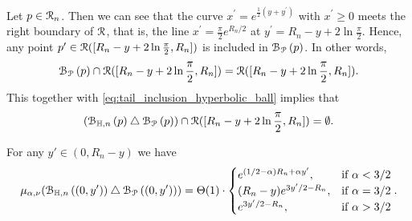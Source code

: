 Let $p \in {\mathcal R}_n$. Then we can see that the curve $x^\prime = e^{\frac{1}{2} (y + y^\prime)}$ with $x^\prime \geq 0$ meets the right boundary of ${\mathcal R}$, that is, the line $x^\prime = \frac{\pi}{2} e^{R_n/2}$ at $y^\prime = R_n - y + 2\ln \frac{\pi}{2}$. Hence, any point $p^{\prime} \in {\mathcal R} ([R_n - y + 2\ln \frac{\pi}{2}, R_n])$ is included in ${\mathcal B}_{{\mathcal P}}\left(p\right)$. In other words,
\begin{equation*} \label{eq:P_ball_inclusion_lower}
{\mathcal B}_{{\mathcal P}}\left(p\right) \cap {\mathcal R} ([R_n - y +2\ln \frac{\pi}{2},R_n]) = {\mathcal R} ([R_n - y + 2\ln \frac{\pi}{2},R_n]).
\end{equation*}
This together with \eqref{eq:tail_inclusion_hyperbolic_ball} implies that 
\begin{equation}\label{eq:symm_diff_upper_P} 
({\mathcal B}_{\mathbb{H},n}\left(p\right) \bigtriangleup {\mathcal B}_{{\mathcal P}}\left(p\right))  \cap {\mathcal R} ([R_n - y + 2 \ln \frac{\pi}{2},R_n]) = \emptyset. 
\end{equation}

\begin{lemma}\label{lem:sym_diff_measure_H_P}
For any $y' \in (0,R_n - y)$ we have
\[
	\mu_{\alpha,\nu} ({\mathcal B}_{\mathbb{H},n}\left((0,y')\right) \bigtriangleup {\mathcal B}_{{\mathcal P}}\left((0,y')\right) ) 
	= \Theta (1) \cdot \begin{cases} 
		e^{(1/2-\alpha)R_n + \alpha y'}, & \mbox{if } \alpha < 3/2 \\
		(R_n-y) e^{3y'/2 - R_n}, & \mbox{if }\alpha = 3/2\\
		e^{3y'/2 - R_n}, &  \mbox{if } \alpha > 3/2 
	\end{cases}.
\]
\end{lemma}

